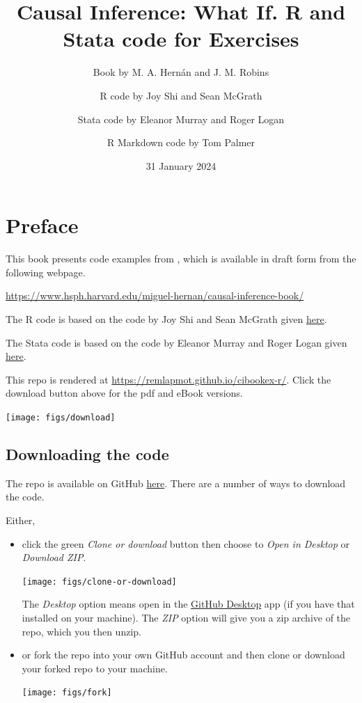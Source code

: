 \documentclass[
  10pt,
  a4paper,
]{book}
\title{Causal Inference: What If. R and Stata code for Exercises}
\author{Book by M. A. Hernán and J. M. Robins \and R code by Joy Shi and Sean McGrath \and Stata code by Eleanor Murray and Roger Logan \and R Markdown code by Tom Palmer}
\date{31 January 2024}
\begin{document}
\maketitle

\thispagestyle{empty}

{
\hypersetup{linkcolor=}
\setcounter{tocdepth}{1}
\tableofcontents
}
\chapter*{Preface}\label{preface}

This book presents code examples from \citet{ci-book}, which is available in draft form from the following webpage.

\url{https://www.hsph.harvard.edu/miguel-hernan/causal-inference-book/}

The R code is based on the code by Joy Shi and Sean McGrath given \href{https://cdn1.sph.harvard.edu/wp-content/uploads/sites/1268/1268/20/Rcode_CIpart2.zip}{here}.

The Stata code is based on the code by Eleanor Murray and Roger Logan given \href{https://cdn1.sph.harvard.edu/wp-content/uploads/sites/1268/2019/11/stata_part2.zip}{here}.

This repo is rendered at \url{https://remlapmot.github.io/cibookex-r/}. Click the download button above for the pdf and eBook versions.

\begin{center}\texttt{[image: figs/download]} \end{center}

\section{Downloading the code}\label{downloading-the-code}

The repo is available on GitHub \href{https://github.com/remlapmot/cibookex-r}{here}. There are a number of ways to download the code.

Either,

\begin{itemize}
\item
  click the green \emph{Clone or download} button then choose to \emph{Open in Desktop} or \emph{Download ZIP}.

  \begin{center}\texttt{[image: figs/clone-or-download]} \end{center}

  The \emph{Desktop} option means open in the \href{https://desktop.github.com/}{GitHub Desktop} app (if you have that installed on your machine). The \emph{ZIP} option will give you a zip archive of the repo, which you then unzip.
\item
  or fork the repo into your own GitHub account and then clone or download your forked repo to your machine.

  \begin{center}\texttt{[image: figs/fork]} \end{center}
\end{itemize}
\end{document}
